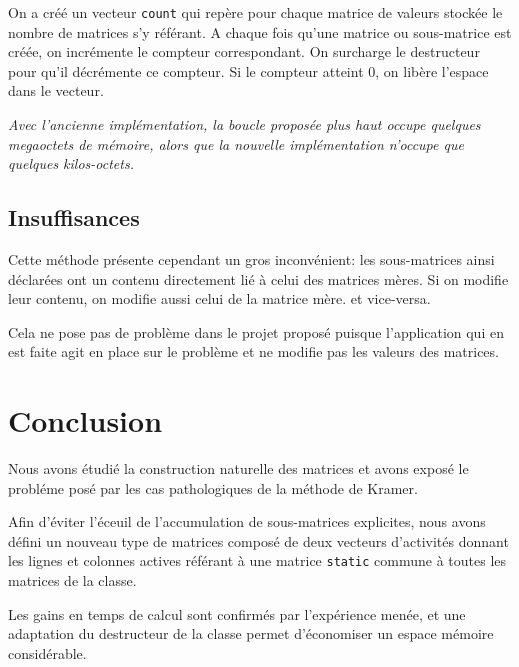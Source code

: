 \documentclass[a4paper,11pt]{article}
\newenvironment{remarque}%
{\description\item[Remarque.]\sl}%
{\enddescription}
\begin{document}
On a créé un vecteur \texttt{count} qui repère pour chaque matrice de valeurs stockée le nombre de matrices s'y référant. A chaque fois qu'une matrice ou sous-matrice est créée, on incrémente le compteur correspondant. On surcharge le destructeur pour qu'il décrémente ce compteur. Si le compteur atteint 0, on libère l'espace dans le vecteur.

\begin{remarque}
Avec l'ancienne implémentation, la boucle proposée plus haut occupe quelques megaoctets de mémoire, alors que la nouvelle implémentation n'occupe que quelques kilos-octets.
\end{remarque}

\subsection{Insuffisances}

Cette méthode présente cependant un gros inconvénient: les sous-matrices ainsi déclarées ont un contenu directement lié à celui des matrices mères. Si on modifie leur contenu, on modifie aussi celui de la matrice mère. et vice-versa.

Cela ne pose pas de problème dans le projet proposé puisque l'application qui en est faite agit en place sur le problème et ne modifie pas les valeurs des matrices.

\section*{Conclusion}

Nous avons étudié la construction naturelle des matrices et avons exposé le probléme posé par les cas pathologiques de la méthode de Kramer.

Afin d'éviter l'éceuil de l'accumulation de sous-matrices explicites, nous avons défini un nouveau type de matrices composé de deux vecteurs d'activités donnant les lignes et colonnes actives référant à une matrice \texttt{static} commune à toutes les matrices de la classe.

Les gains en temps de calcul sont confirmés par l'expérience menée, et une adaptation du destructeur de la classe permet d'économiser un espace mémoire considérable. 
\end{document}
